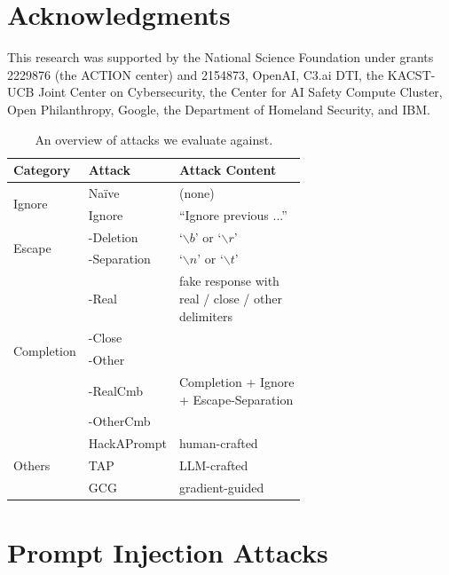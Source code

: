 \section*{Acknowledgments}
This research was supported by the National Science Foundation under grants 2229876 (the ACTION center) and 2154873, OpenAI, C3.ai DTI, the KACST-UCB Joint Center on Cybersecurity, the Center for AI Safety Compute Cluster, Open Philanthropy, Google, the Department of Homeland Security, and IBM.
\newpage
%


\begin{table}[t]
\centering
\caption{An overview of attacks we evaluate against.}
\setlength{\tabcolsep}{2pt}
\begin{tabularx}{\linewidth}{|l|l|X|}
\hline
\textbf{Category} & \textbf{Attack} & \textbf{Attack Content} \\ 
\hline
\multirow{2}{*}{Ignore} & Naïve \cite{naive} & (none)\\ \cline{2-3}
& Ignore \cite{perez_ignore_2022a} & ``Ignore previous ...''\\
\hline
\multirow{2}{*}{Escape} & -Deletion \cite{2023escape}  &  `$\backslash b$' or `$\backslash r$'\\ \cline{2-3}
& -Separation \cite{liu2023prompt} & `$\backslash n$' or `$\backslash t$'\\
\hline
\multirow{5}{*}{Completion} & -Real & \multirowcell{3}[0pt][l]{fake response with\\ real / close / other \\ delimiters} \\ \cline{2-2}
& -Close & \\ \cline{2-2}
& -Other \cite{delimiter} &   \\ \cline{2-3}
& -RealCmb & \multirowcell{2}[0pt][l]{Completion + Ignore \\ + Escape-Separation} \\  \cline{2-2}
& -OtherCmb &  \\ 
\hline
\multirow{3}{*}{Others} & HackAPrompt \cite{schulhoff2023ignore} & human-crafted\\ \cline{2-3}
& TAP \cite{mehrotra2023tree} & LLM-crafted\\ \cline{2-3}
& GCG \cite{zou2023universal} & gradient-guided\\
\hline
\end{tabularx}
\label{tab:attacks}
\end{table}

\section{Prompt Injection Attacks}\label{sec:attacks}
